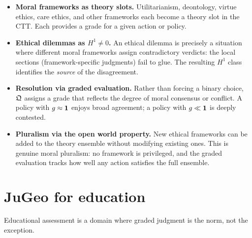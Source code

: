 \begin{itemize}
  \item \textbf{Moral frameworks as theory slots.}\;
        Utilitarianism, deontology, virtue ethics, care ethics,
        and other frameworks each become a theory slot in the CTT.
        Each provides a grade for a given action or policy.
  \item \textbf{Ethical dilemmas as $H^1 \neq 0$.}\;
        An ethical dilemma is precisely a situation where different
        moral frameworks assign contradictory verdicts: the local
        sections (framework-specific judgments) fail to glue.
        The resulting $H^1$ class identifies the \emph{source} of
        the disagreement.
  \item \textbf{Resolution via graded evaluation.}\;
        Rather than forcing a binary choice, $\mathfrak{Q}$ assigns a
        grade that reflects the degree of moral consensus or
        conflict.  A policy with $g \approx \mathbf{1}$ enjoys broad
        agreement; a policy with $g \ll \mathbf{1}$ is deeply contested.
  \item \textbf{Pluralism via the open world property.}\;
        New ethical frameworks can be added to the theory ensemble
        without modifying existing ones.  This is genuine moral
        pluralism: no framework is privileged, and the graded
        evaluation tracks how well any action satisfies the full
        ensemble.
\end{itemize}

\section{JuGeo for education}
\label{sec:education}

Educational assessment is a domain where graded judgment is
the norm, not the exception.

